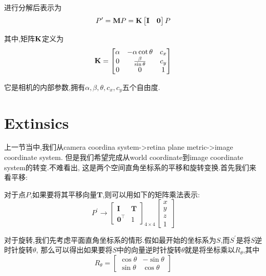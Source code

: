 进行分解后表示为
\begin{equation}
	P^\prime = \bold{M} P = \bold{K} \begin{bmatrix}
		\bold{I} & \bold{0}
	\end{bmatrix} P
\end{equation}

其中,矩阵$\bold{K}$定义为
\begin{equation}
	\bold{K} = \begin{bmatrix}
		\alpha & -\alpha \cot \theta & c_x
		\\
		0 & \frac{\beta}{\sin \theta} & c_y
		\\
		0 & 0 & 1
	\end{bmatrix}
\end{equation}

它是相机的内部参数,拥有$\alpha, \beta, \theta, c_x, c_y$五个自由度.

\section{Extinsics}
上一节当中,我们从camera coordina system->retina plane metric->image coordinate system.
但是我们希望完成从world coordinate到image coordinate system的转变.不难看出,
这是两个空间直角坐标系的平移和旋转变换.首先我们来看平移:

对于点$P$,如果要将其平移向量$\bm T$,则可以用如下的矩阵乘法表示:
\begin{equation}
	P^{\prime} \rightarrow\left[\begin{array}{ll}
		\mathbf{I} & \bm T \\
		\bm 0^\top & 1
	\end{array}\right]_{4 \times 4}\left[\begin{array}{c}
		x \\
		y \\
		z \\
		1
	\end{array}\right]
\end{equation}

对于旋转,我们先考虑平面直角坐标系的情形.假如最开始的坐标系为$S$,而$S^\prime$是将$S$逆时针旋转$\theta$,
那么可以得出如果要将$S$中的向量逆时针旋转$\theta$就是将坐标乘以$R_\theta$,其中
\begin{equation}
	R_{\theta} = \begin{bmatrix}
		\cos \theta & - \sin \theta
		\\
		\sin\theta & \cos \theta
	\end{bmatrix}
\end{equation}

